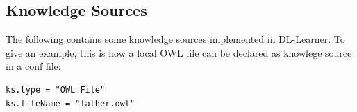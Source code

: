 \documentclass[a4paper,12pt]{scrartcl}
\begin{document}
\subsection{Knowledge Sources}
\label{sec:knowledgesources}

The following contains some knowledge sources implemented in DL-Learner. To give an example, this is how a local OWL file can be declared as knowlege source in a conf file:
\begin{verbatim}
ks.type = "OWL File"
ks.fileName = "father.owl"
\end{verbatim}
\end{document}
